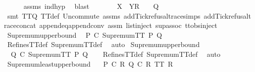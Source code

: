 \begin{isabellebody}
\ \ \ \ \isamarkupfalse%
\ {\isasymrho}{\isacharunderscore}assms\ ind{\isacharunderscore}hyp\ \isamarkupfalse%
\ blast\isanewline
\ \ \isamarkupfalse%
\ \isamarkupfalse%
\ {\isachardoublequoteopen}{\isasymrho}{\isacharprime}\ {\isacharat}\ {\isacharbrackleft}X\ {\isasymunion}\ Y{\isacharbrackright}\isactrlsub R\ {\isacharhash}\ {\isasymsigma}\ {\isasymin}\ Q{\isachardoublequoteclose}\isanewline
\ \ \ \ \isamarkupfalse%
\ {\isacharparenleft}smt\ TT{}{\isacharunderscore}Q\ TT{}{\isacharunderscore}def\ Un{\isacharunderscore}commute\ {\isasymrho}{\isacharunderscore}assms\ add{\isacharunderscore}Tick{\isacharunderscore}refusal{\isacharunderscore}trace{\isachardot}simps{\isacharparenleft}{}{\isacharparenright}\ add{\isacharunderscore}Tick{\isacharunderscore}refusal{\isacharunderscore}trace{\isacharunderscore}concat\ append{\isacharunderscore}eq{\isacharunderscore}append{\isacharunderscore}conv\ assm{}\ list{\isachardot}inject\ sup{\isacharunderscore}assoc\ ttobs{\isachardot}inject{\isacharparenleft}{}{\isacharparenright}{\isacharparenright}\isanewline
{}\isamarkupfalse%
%
\endisatagproof
{\isafoldproof}%
%
\isadelimproof
\isanewline
%
\endisadelimproof
\isanewline
{}\isamarkupfalse%
\ Supremum{\isacharunderscore}upper{\isacharunderscore}bound{}{\isacharcolon}\isanewline
\ \ {\isachardoublequoteopen}P\ {\isasymsqsubseteq}\isactrlsub C\ SupremumTT\ P\ Q{\isachardoublequoteclose}\isanewline
%
\isadelimproof
\ \ %
\endisadelimproof
%
\isatagproof
{}\isamarkupfalse%
\ RefinesTT{\isacharunderscore}def\ SupremumTT{\isacharunderscore}def\ \isamarkupfalse%
\ auto%
\endisatagproof
{\isafoldproof}%
%
\isadelimproof
\isanewline
%
\endisadelimproof
\isanewline
{}\isamarkupfalse%
\ Supremum{\isacharunderscore}upper{\isacharunderscore}bound{}{\isacharcolon}\isanewline
\ \ {\isachardoublequoteopen}Q\ {\isasymsqsubseteq}\isactrlsub C\ SupremumTT\ P\ Q{\isachardoublequoteclose}\isanewline
%
\isadelimproof
\ \ %
\endisadelimproof
%
\isatagproof
{}\isamarkupfalse%
\ RefinesTT{\isacharunderscore}def\ SupremumTT{\isacharunderscore}def\ \isamarkupfalse%
\ auto%
\endisatagproof
{\isafoldproof}%
%
\isadelimproof
\isanewline
%
\endisadelimproof
\isanewline
{}\isamarkupfalse%
\ Supremum{\isacharunderscore}least{\isacharunderscore}upper{\isacharunderscore}bound{\isacharcolon}\isanewline
\ \ \ {\isachardoublequoteopen}P\ {\isasymsqsubseteq}\isactrlsub C\ R{\isachardoublequoteclose}\ {\isachardoublequoteopen}Q\ {\isasymsqsubseteq}\isactrlsub C\ R{\isachardoublequoteclose}\ {\isachardoublequoteopen}TT{}\ R{\isachardoublequoteclose}\isanewline

\end{isabellebody}
